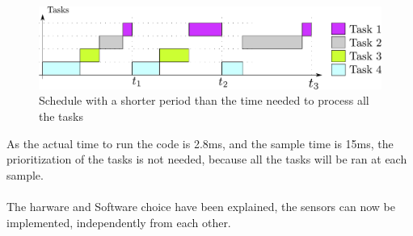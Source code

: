  \begin{figure}[H]
	\centering
	\includegraphics[scale=0.5]{figures/roundRobinSchedule2.pdf}
	\caption{Schedule with a shorter period than the time needed to process all the tasks}
	\label{roundRobinSchedule2}
\end{figure}

As the actual time to run the code is 2.8ms, and the sample time is 15ms, the prioritization of the tasks is not needed, because all the tasks will be ran at each sample.\\\\



The harware and Software choice have been explained, the sensors can now be implemented, independently from each other.
